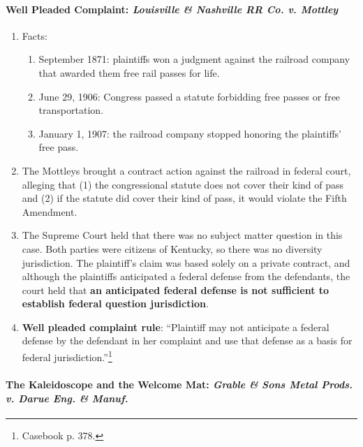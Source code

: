 \paragraph{Well Pleaded Complaint: \emph{Louisville \& Nashville RR Co. v. Mottley}}

\begin{enumerate}
    \item Facts:
    \begin{enumerate}
        \item September 1871: plaintiffs won a judgment against the railroad company that awarded them free rail passes for life.
        \item June 29, 1906: Congress passed a statute forbidding free passes or free transportation.
        \item January 1, 1907: the railroad company stopped honoring the plaintiffs' free pass.
    \end{enumerate}
    \item The Mottleys brought a contract action against the railroad in federal court, alleging that (1) the congressional statute does not cover their kind of pass and (2) if the statute did cover their kind of pass, it would violate the Fifth Amendment.
    \item The Supreme Court held that there was no subject matter question in this case. Both parties were citizens of Kentucky, so there was no diversity jurisdiction. The plaintiff's claim was based solely on a private contract, and although the plaintiffs anticipated a federal defense from the defendants, the court held that \textbf{an anticipated federal defense is not sufficient to establish federal question jurisdiction}.
    \item \textbf{Well pleaded complaint rule}: ``Plaintiff may not anticipate a federal defense by the defendant in her complaint and use that defense as a basis for federal jurisdiction.''\footnote{Casebook p. 378.}
\end{enumerate}

\paragraph{The Kaleidoscope and the Welcome Mat: \emph{Grable \& Sons Metal Prods. v. Darue Eng. \& Manuf.}}

